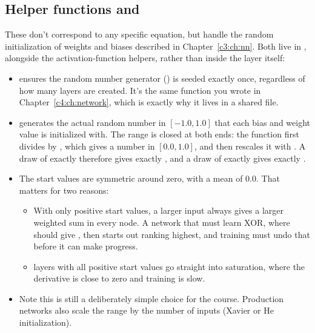 \subsection{Helper functions  and }
These don't correspond to any specific equation, but handle the random initialization of weights
and biases described in Chapter~\ref{c3:ch:nn}. Both live in , alongside the
activation-function helpers, rather than inside the layer itself:
\begin{itemize}
  \item {} ensures the random number generator () is seeded
    exactly once, regardless of how many layers are created. It's the same function you wrote in
    Chapter~\ref{c4:ch:network}, which is exactly why it lives in a shared file.
  \item {} generates the actual random number in $[-1.0, 1.0]$ that each bias
    and weight value is initialized with. The range is closed at both ends: the function first
    divides by , which gives a number in $[0.0, 1.0]$, and then rescales it with
    . A draw of exactly  therefore gives exactly , and a
    draw of exactly  gives exactly .
  \item The start values are symmetric around zero, with a mean of 0.0. That matters for two
    reasons:
  \begin{itemize}
    \item With only positive start values, a larger input always gives a larger weighted sum in
      every node. A network that must learn XOR, where  should give , then
      starts out ranking  highest, and training must undo that before it can make
      progress.
    \item {} layers with all positive start values go straight into saturation, where the
      derivative is close to zero and training is slow.
  \end{itemize}
  \item Note this is still a deliberately simple choice for the course. Production networks also
    scale the range by the number of inputs (Xavier or He initialization).
\end{itemize}

